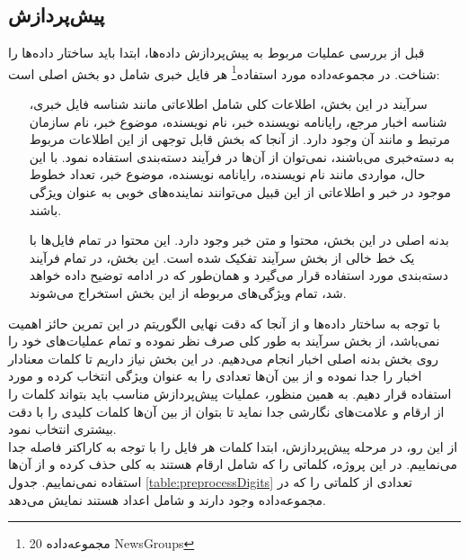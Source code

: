 \documentclass[11.5pt,a4paper]{article}
\begin{document}
\subsection{پیش‌پردازش}
قبل از بررسی عملیات مربوط به پیش‌پردازش داده‌ها،‌ ابتدا باید ساختار داده‌ها را شناخت. در مجموعه‌داده مورد استفاده\footnote{مجموعه‌داده 20 NewsGroups} هر فایل خبری شامل دو بخش اصلی است:
\begin{itemize}
\item [سرآیند] 
در این بخش، اطلاعات کلی شامل اطلاعاتی مانند شناسه فایل خبری، شناسه اخبار مرجع، رایانامه نویسنده خبر، نام نویسنده،‌ موضوع خبر،‌ نام سازمان مرتبط و مانند آن وجود دارد. از آنجا که بخش قابل توجهی از این اطلاعات مربوط به دسته‌خبری می‌باشند، نمی‌توان از آن‌ها در فرآیند دسته‌بندی استفاده نمود. با این حال، مواردی مانند نام نویسنده، رایانامه نویسنده، موضوع خبر، تعداد خطوط موجود در خبر و اطلاعاتی از این قبیل می‌توانند نماینده‌های خوبی به عنوان ویژگی باشند.
\item [بدنه اصلی]
در این بخش، محتوا و متن خبر وجود دارد. این محتوا در تمام فایل‌ها با یک خط خالی از بخش سرآیند تفکیک شده است. این بخش، در تمام فرآیند دسته‌بندی مورد استفاده قرار می‌گیرد و همان‌طور که در ادامه توضیح داده خواهد شد، تمام ویژگی‌های مربوطه از این بخش استخراج می‌شوند.
\end{itemize}

با توجه به ساختار داده‌ها و از آنجا که دقت نهایی الگوریتم در این تمرین حائز اهمیت نمی‌باشد،‌ از بخش سرآیند به طور کلی صرف نظر نموده و تمام عملیات‌های خود را روی بخش بدنه اصلی اخبار انجام می‌دهیم. در این بخش نیاز داریم تا کلمات معنادار اخبار را جدا نموده و از بین آن‌ها تعدادی را به عنوان ویژگی انتخاب کرده و مورد استفاده قرار دهیم. به همین منظور، عملیات پیش‌پردازش مناسب باید بتواند کلمات را از ارقام و علامت‌های نگارشی جدا نماید تا بتوان از بین آن‌ها کلمات کلیدی را با دقت بیشتری انتخاب نمود.\\
از این رو، در مرحله پیش‌پردازش، ابتدا کلمات هر فایل را با توجه به کاراکتر فاصله جدا می‌نماییم. در این پروژه، کلماتی را که شامل ارقام هستند به کلی حذف کرده و از آن‌ها استفاده نمی‌نماییم. جدول \ref{table:preprocessDigits} تعدادی از کلماتی را که در مجموعه‌داده وجود دارند و شامل اعداد هستند نمایش می‌دهد.
\end{document}
